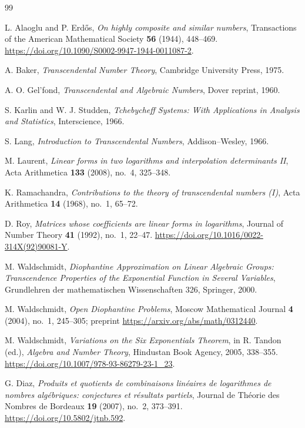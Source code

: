 \documentclass[11pt,oneside]{article}
\theoremstyle{definition}
\theoremstyle{remark}
\begin{document}
\begin{thebibliography}{99}

L. Alaoglu and P. Erd\H{o}s,
\emph{On highly composite and similar numbers},
Transactions of the American Mathematical Society \textbf{56} (1944), 448--469.
\url{https://doi.org/10.1090/S0002-9947-1944-0011087-2}.

A. Baker,
\emph{Transcendental Number Theory},
Cambridge University Press, 1975.

A. O. Gel'fond,
\emph{Transcendental and Algebraic Numbers},
Dover reprint, 1960.

S. Karlin and W. J. Studden,
\emph{Tchebycheff Systems: With Applications in Analysis and Statistics},
Interscience, 1966.

S. Lang,
\emph{Introduction to Transcendental Numbers},
Addison--Wesley, 1966.

M. Laurent,
\emph{Linear forms in two logarithms and interpolation determinants II},
Acta Arithmetica \textbf{133} (2008), no.~4, 325--348.

K. Ramachandra,
\emph{Contributions to the theory of transcendental numbers (I)},
Acta Arithmetica \textbf{14} (1968), no.~1, 65--72.

D. Roy,
\emph{Matrices whose coefficients are linear forms in logarithms},
Journal of Number Theory \textbf{41} (1992), no.~1, 22--47.
\url{https://doi.org/10.1016/0022-314X(92)90081-Y}.

M. Waldschmidt,
\emph{Diophantine Approximation on Linear Algebraic Groups: Transcendence Properties of the
Exponential Function in Several Variables},
Grundlehren der mathematischen Wissenschaften 326, Springer, 2000.

M. Waldschmidt,
\emph{Open Diophantine Problems},
Moscow Mathematical Journal \textbf{4} (2004), no.~1, 245--305;
preprint \url{https://arxiv.org/abs/math/0312440}.

M. Waldschmidt,
\emph{Variations on the Six Exponentials Theorem},
in R. Tandon (ed.), \emph{Algebra and Number Theory}, Hindustan Book Agency, 2005,
338--355.
\url{https://doi.org/10.1007/978-93-86279-23-1_23}.

G. Diaz,
\emph{Produits et quotients de combinaisons lin\'eaires de logarithmes de nombres
alg\'ebriques: conjectures et r\'esultats partiels},
Journal de Th\'eorie des Nombres de Bordeaux \textbf{19} (2007), no.~2, 373--391.
\url{https://doi.org/10.5802/jtnb.592}.


\end{thebibliography}
\end{document}
